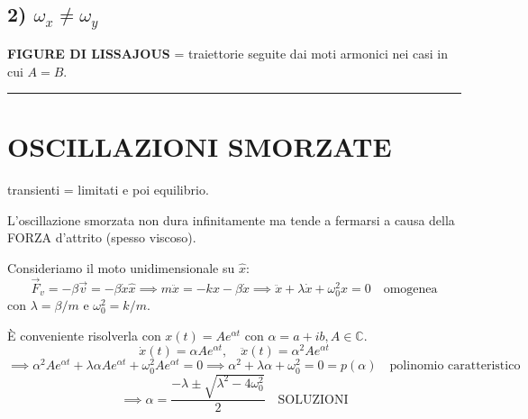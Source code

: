 \documentclass{article}
\begin{document}
\subsection*{2) $\omega_x \neq \omega_y$}
\textbf{FIGURE DI LISSAJOUS} = traiettorie seguite dai moti armonici nei casi in cui $A=B$.

\vspace{0.5cm}
\hrule
\vspace{0.5cm}

\section*{OSCILLAZIONI SMORZATE}
transienti = limitati e poi equilibrio.

L'oscillazione smorzata non dura infinitamente ma tende a fermarsi a causa della FORZA d'attrito (spesso viscoso).

Consideriamo il moto unidimensionale su $\hat{x}$:
\begin{equation*}
\vec{F}_v = -\beta \vec{v} = -\beta \dot{x} \hat{x} \implies m\ddot{x} = -kx - \beta \dot{x} \implies \ddot{x} + \lambda \dot{x} + \omega_0^2 x = 0 \quad \text{omogenea}
\end{equation*}
con $\lambda = \beta/m$ e $\omega_0^2 = k/m$.

È conveniente risolverla con $x(t) = A e^{\alpha t}$ con $\alpha = a + ib, A \in \mathbb{C}$.
\begin{equation*}
\dot{x}(t) = \alpha A e^{\alpha t}, \quad \ddot{x}(t) = \alpha^2 A e^{\alpha t}
\end{equation*}
\begin{equation*}
\implies \alpha^2 A e^{\alpha t} + \lambda \alpha A e^{\alpha t} + \omega_0^2 A e^{\alpha t} = 0 \implies \alpha^2 + \lambda \alpha + \omega_0^2 = 0 = p(\alpha) \quad \text{polinomio caratteristico}
\end{equation*}
\begin{equation*}
\implies \alpha = \frac{-\lambda \pm \sqrt{\lambda^2 - 4\omega_0^2}}{2} \quad \text{SOLUZIONI}
\end{equation*}
\end{document}
